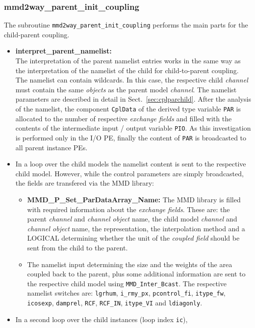 \documentclass[11pt,twoside]{article}
\begin{document}
\subsubsection{mmd2way\_parent\_init\_coupling}
The subroutine \verb|mmd2way_parent_init_coupling| performs the main parts for
the child-parent coupling.
\begin{itemize} %
\item {\bf interpret\_parent\_namelist:\label{sec:interpretparnamelist}\\}
The interpretation of the parent namelist entries works in the same
way as the
interpretation of the namelist of the child for child-to-parent coupling.
The namelist can contain wildcards. In this case, the respective child {\it
channel} 
must contain the same {\it objects} as the parent model {\it channel}.
The namelist parameters are described in detail in
Sect.\ \ref{sec:cplparchild}.
After the analysis of the namelist, the component \verb|CplData| of the
derived type variable \verb|PAR| is allocated to the number of respective
{\it exchange fields} and filled with the contents of the intermediate input /
output variable \verb|PIO|. As this investigation is performed only in the I/O
PE, finally the content of \verb|PAR| is broadcasted to all parent instance PEs.
\item In a loop over the child models the namelist content is sent to the
respective child model. However, while the control parameters are simply
broadcasted, the fields are transfered via the MMD library:
\begin{itemize} %
\item {\bf MMD\_P\_Set\_ParDataArray\_Name:} 
The MMD library is filled with required information about the {\it exchange
fields}. These are: the parent {\it channel} and {\it channel object} name, the
child model {\it 
channel} and {\it channel object} name, the representation, the interpolation
method and a {\footnotesize LOGICAL} determining whether the unit of
the {\it coupled field} should be sent from the child to the parent.
\item The namelist input determining the size and the weights of the area
coupled back to the parent, plus some additional information are sent to the
respective child model using \verb|MMD_Inter_Bcast|. The respective namelist
switches
are: \verb|lgrhum|, \verb|i_rmy_px|, \verb|pcontrol_fi|, \verb|itype_fw|, 
\verb|icosexp|, \verb|damprel|, \verb|RCF|, \verb|RCF_IN|, \verb|itype_VI|
and \verb|ldiagonly|. 
\end{itemize}%
\item In a second loop over the child instances (loop index \verb|ic|),

\end{itemize}
\end{document}
